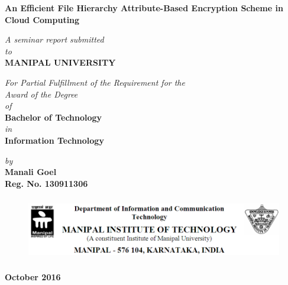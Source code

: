 \documentclass[a4paper,12pt]{article}
\begin{document}
\begin{titlepage}
\vspace*{2cm}
	\begin{center}
	\large{\textbf{An Efficient File Hierarchy Attribute-Based Encryption Scheme in Cloud Computing}}
	\end{center}
	\vspace{0.5cm}
	\begin{center}
	\small{\textit{A seminar report submitted} \\ \vspace{0.25cm} \textit{to} \\ \vspace{0.25cm}\textbf{MANIPAL UNIVERSITY} \\}
	\end{center}
	\vspace{0.25cm}
	\begin{center}
	\small{\textit{For Partial Fulfillment of the Requirement for the\\ \vspace{0.25cm}Award of the Degree\\ \vspace{0.25cm}of}} \\ \vspace{0.25cm}
	\textbf{Bachelor of Technology} \\  \vspace{0.25cm} \textit{in} \\ \textbf{Information Technology}
	\end{center}
	
	\begin{center}
	\small{\textit{by}} \\
	\textbf{Manali Goel} \\ \textbf{Reg. No. 130911306} \\
	\end{center}

	\begin{figure}[h]
  \begin{center}
	\includegraphics[height=2.8cm]{man}
	\end{center}
	\end{figure}
	\begin{center}
	\textbf{October 2016}
	\end{center}
\end{titlepage}
\end{document}
